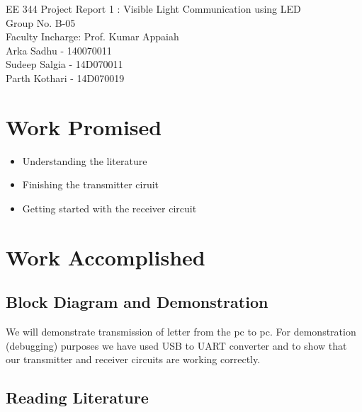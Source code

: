 \documentclass{article}
\begin{document}

EE 344 Project Report 1 : Visible Light Communication using LED\\
Group No. B-05\\
Faculty Incharge: Prof. Kumar Appaiah\\
Arka Sadhu - 140070011\\
Sudeep Salgia - 14D070011\\
Parth Kothari - 14D070019\\
\vspace{-1.0cm}

\section{Work Promised}

\begin{itemize}
\item Understanding the literature
\item Finishing the transmitter ciruit
\item Getting started with the receiver circuit
\end{itemize}

\section{Work Accomplished }

\subsection{Block Diagram and Demonstration}
We will demonstrate transmission of letter from the pc to pc. For demonstration (debugging) purposes we have used USB to UART converter
and to show that our transmitter and receiver circuits are working correctly.

\subsection{Reading Literature}
\end{document}
